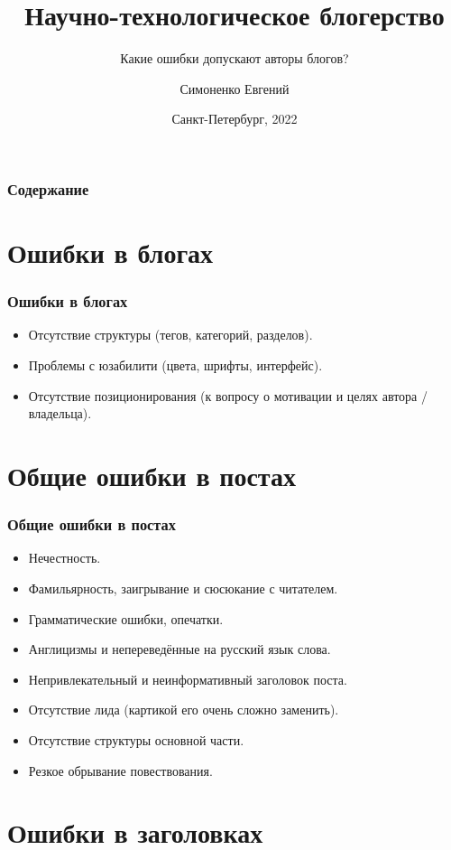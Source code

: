 \documentclass[12pt]{beamer}
\title[Блогерство]{Научно-технологическое блогерство}
\subtitle{Какие ошибки допускают авторы блогов?}
\author[]{Симоненко Евгений}
\institute[]{Университет ИТМО}
\date[]{Санкт-Петербург, 2022}
\begin{document}
\begin{frame}
  \titlepage
\end{frame}

\begin{frame}
  \frametitle{Содержание}
  \tableofcontents
\end{frame}

\section{Ошибки в блогах}

\begin{frame}
  \frametitle{Ошибки в блогах}
  \begin{itemize}
  \item Отсутствие структуры (тегов, категорий, разделов).
  \item Проблемы с юзабилити (цвета, шрифты, интерфейс).
  \item Отсутствие позиционирования (к вопросу о мотивации и целях автора / владельца).
  \end{itemize}
\end{frame}

\section{Общие ошибки в постах}

\begin{frame}
  \frametitle{Общие ошибки в постах}
  \begin{itemize}
  \item Нечестность.
  \item Фамильярность, заигрывание и сюсюкание с читателем.
  \item Грамматические ошибки, опечатки.
  \item Англицизмы и непереведённые на русский язык слова.
  \item Непривлекательный и неинформативный заголовок поста.
  \item Отсутствие лида (картикой его очень сложно заменить).
  \item Отсутствие структуры основной части.
  \item Резкое обрывание повествования.
  \end{itemize}
\end{frame}

\section{Ошибки в заголовках}
\end{document}
